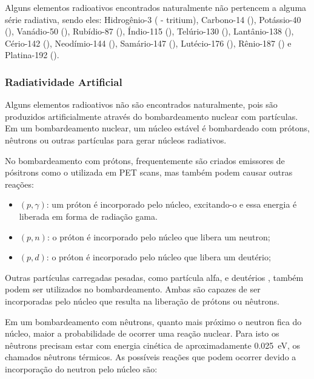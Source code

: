 \documentclass[11pt,a4paper]{article}
\begin{document}
                Alguns elementos radioativos encontrados naturalmente não pertencem a alguma série radiativa, sendo eles: Hidrogênio-3 ( - tritium),  Carbono-14 (), Potássio-40 (), Vanádio-50 (), Rubídio-87 (), Índio-115 (), Telúrio-130 (), Lantânio-138 (), Cério-142 (), Neodímio-144 (), Samário-147 (), Lutécio-176 (), Rênio-187 () e Platina-192 ().
            
            \subsubsection{Radiatividade Artificial}

                Alguns elementos radioativos não são encontrados naturalmente, pois são produzidos artificialmente através do bombardeamento nuclear com partículas. Em um bombardeamento nuclear, um núcleo estável é bombardeado com prótons, nêutrons ou outras partículas para gerar núcleos radiativos.

                No bombardeamento com prótons, frequentemente são criados emissores de pósitrons como o  utilizada em PET scans, mas também podem causar outras reações:

                    \begin{itemize}
                        \item $(p, \gamma)$: um próton é incorporado pelo núcleo, excitando-o e essa energia é liberada em forma de radiação gama.
                        \item $(p, n)$: o próton é incorporado pelo núcleo que libera um neutron;
                        \item $(p, d)$: o próton é incorporado pelo núcleo que libera um deutério;
                    \end{itemize}

                Outras partículas carregadas pesadas, como partícula alfa, e deutérios , também podem ser utilizados no bombardeamento. Ambas são capazes de ser incorporadas pelo núcleo que resulta na  liberação de prótons ou nêutrons.

                Em um bombardeamento com nêutrons, quanto mais próximo o neutron fica do núcleo, maior a probabilidade de ocorrer uma reação nuclear. Para isto os nêutrons precisam estar com energia cinética de aproximadamente \qty{0.025}{eV}, os chamados nêutrons térmicos. As possíveis reações que podem ocorrer devido a incorporação do neutron pelo núcleo são:
\end{document}
